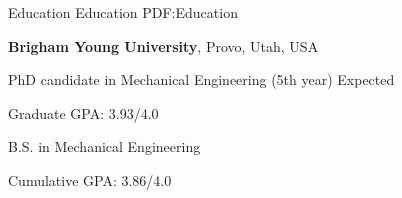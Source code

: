\documentclass[letterpaper,MMMyyyy,nonstopmode]{simpleresumecv}
\begin{document}
\begin{Body}


\Section
{Education}
{Education}
{PDF:Education}

\Entry
{\textbf{Brigham Young University}},
Provo, Utah, USA

\Gap
\BulletItem
PhD candidate in Mechanical Engineering (5th year)
\hfill
Expected 
\begin{Detail}
\SubBulletItem
Graduate GPA: 3.93/4.0
\end{Detail}

\BulletItem
B.S. in Mechanical Engineering
\hfill
\begin{Detail}
\SubBulletItem
Cumulative GPA: 3.86/4.0
\end{Detail}





\end{Body}
\end{document}
